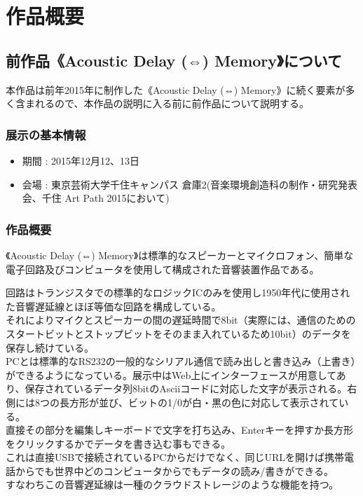 \documentclass[a4paper,report]{jsbook}
\begin{document}
\chapter{作品概要}\label{ux4f5cux54c1ux6982ux8981}

\section{前作品《Acoustic Delay (⇔)
Memory》について}\label{ux524dux4f5cux54c1acoustic-delay-memoryux306bux3064ux3044ux3066}

本作品は前年2015年に制作した《Acoustic Delay (⇔)
Memory》に続く要素が多く含まれるので、本作品の説明に入る前に前作品について説明する。

\subsection{展示の基本情報}\label{ux5c55ux793aux306eux57faux672cux60c5ux5831}

\begin{itemize}
\tightlist
\item
  期間 : 2015年12月12、13日
\item
  会場 : 東京芸術大学千住キャンパス
  倉庫2(音楽環境創造科の制作・研究発表会、千住 Art Path 2015において)
\end{itemize}

\subsection{作品概要}\label{ux4f5cux54c1ux6982ux8981-1}

《Acoustic Delay (⇔)
Memory》は標準的なスピーカーとマイクロフォン、簡単な電子回路及びコンピュータを使用して構成された音響装置作品である。

回路はトランジスタでの標準的なロジックICのみを使用し1950年代に使用された音響遅延線とほぼ等価な回路を構成している。\\
それによりマイクとスピーカーの間の遅延時間で8bit（実際には、通信のためのスタートビットとストップビットをそのまま入れているため10bit）のデータを保存し続けている。\\
PCとは標準的なRS232の一般的なシリアル通信で読み出しと書き込み（上書き）ができるようになっている。展示中はWeb上にインターフェースが用意してあり、保存されているデータ列8bitのAsciiコードに対応した文字が表示される。右側には8つの長方形が並び、ビットの1/0が白・黒の色に対応して表示されている。\\
直接その部分を編集しキーボードで文字を打ち込み、Enterキーを押すか長方形をクリックするかでデータを書き込む事もできる。\\
これは直接USBで接続されているPCからだけでなく、同じURLを開けば携帯電話からでも世界中どのコンピュータからでもデータの読み/書きができる。\\
すなわちこの音響遅延線は一種のクラウドストレージのような機能を持つ。
\end{document}
